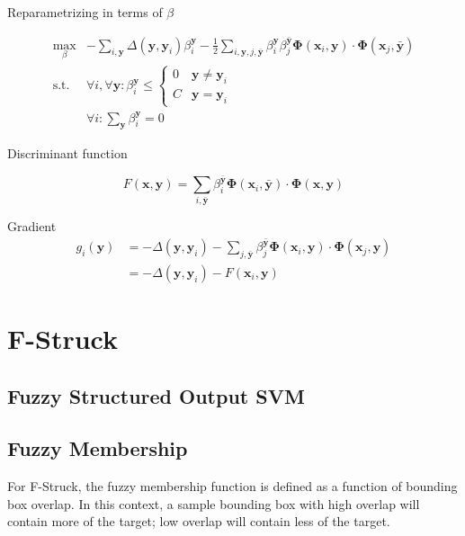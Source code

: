\documentclass{IEEEtran}
\renewcommand{\vec}[1]{\mathbf{#1}}
\newcommand{\half}{\frac{1}{2}}
\newcommand{\loss}{\Delta\left(\vec{y}, \vec{y}_i\right)}
\begin{document}
Reparametrizing in terms of \(\beta\)

\begin{align}
    \max_\beta & -\sum_{i,\vec{y}} \loss \beta_i^\vec{y} - \half
    \sum_{i,\vec{y},j,\vec{\bar{y}}} \beta_i^\vec{y} \beta_j^\vec{\bar{y}}
    \vec{\Phi}\left(\vec{x}_i, \vec{y}\right) \cdot \vec{\Phi}\left(\vec{x}_j,
    \vec{\bar{y}}\right) \\
    \text{s.t. } & \forall i, \forall \vec{y} : \beta_i^\vec{y} \le
    \begin{cases}
        0 & \vec{y} \ne \vec{y}_i \\
        C & \vec{y} = \vec{y}_i
    \end{cases} \nonumber \\
    & \forall i : \sum_\vec{y} \beta_i^\vec{y} = 0 \nonumber
\end{align}

Discriminant function

\begin{displaymath}
    F(\vec{x}, \vec{y}) = \sum_{i,\vec{\bar{y}}} \beta_i^\vec{\bar{y}}
    \vec{\Phi}\left(\vec{x}_i, \vec{\bar{y}}\right) \cdot \vec{\Phi}\left(\vec{x},
    \vec{y}\right)
\end{displaymath}

Gradient
\begin{align}
    g_i\left(\vec{y}\right) &= - \loss - \sum_{j,\vec{\bar{y}}} \beta_j^\vec{\bar{y}}
    \vec{\Phi}\left(\vec{x}_i, \vec{y}\right) \cdot \vec{\Phi}\left(\vec{x}_j,
    \vec{y}\right) \\
    &= - \loss - F\left(\vec{x}_i, \vec{y}\right) \nonumber
\end{align}

\section{F-Struck} %

\subsection{Fuzzy Structured Output SVM}

\subsection{Fuzzy Membership} %
For F-Struck, the fuzzy membership function is defined as a function of bounding box overlap. In
this context, a sample bounding box with high overlap will contain more of the target; low overlap
will contain less of the target.
\end{document}
